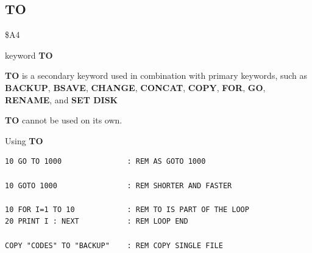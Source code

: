 
\newpage
\subsection{TO}
\begin{description}[leftmargin=2cm,style=nextline]
\item [Token:]    \$A4

\item [Format:]   keyword {\bf TO}

\item [Usage:]    {\bf TO} is a secondary keyword used in combination with primary key\-words, such as {\bf BACKUP}, {\bf BSAVE}, {\bf CHANGE}, {\bf CONCAT}, {\bf COPY}, {\bf FOR}, {\bf GO}, {\bf RENAME}, and {\bf SET DISK}

\item [Remarks:]  {\bf TO} cannot be used on its own.

\item [Example:]  Using {\bf TO}

\begin{tcolorbox}[colback=black,coltext=white]
\verbatimfont{\codefont}
\begin{verbatim}
10 GO TO 1000               : REM AS GOTO 1000

10 GOTO 1000                : REM SHORTER AND FASTER

10 FOR I=1 TO 10            : REM TO IS PART OF THE LOOP
20 PRINT I : NEXT           : REM LOOP END

COPY "CODES" TO "BACKUP"    : REM COPY SINGLE FILE
\end{verbatim}
\end{tcolorbox}
\end{description}


\newpage
